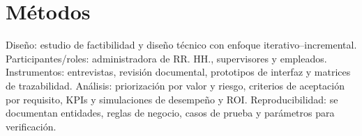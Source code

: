 \section{Métodos}
Diseño: estudio de factibilidad y diseño técnico con enfoque iterativo–incremental. Participantes/roles: administradora de RR. HH., supervisores y empleados. Instrumentos: entrevistas, revisión documental, prototipos de interfaz y matrices de trazabilidad. Análisis: priorización por valor y riesgo, criterios de aceptación por requisito, KPIs y simulaciones de desempeño y ROI. Reproducibilidad: se documentan entidades, reglas de negocio, casos de prueba y parámetros para verificación.